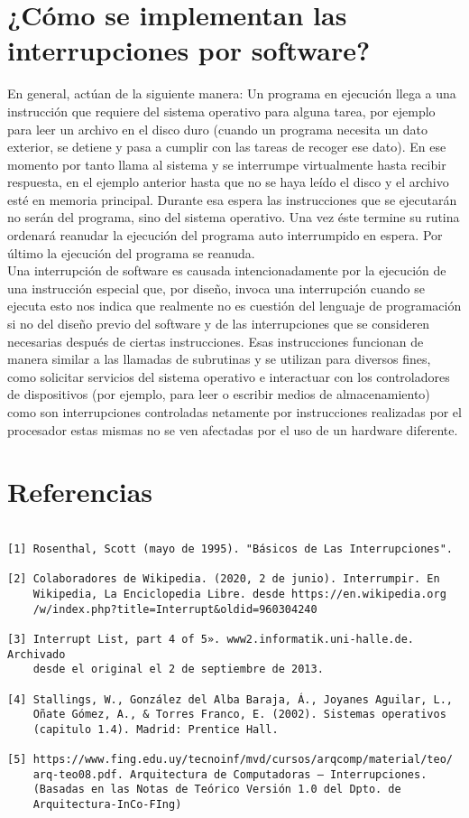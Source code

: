 \documentclass{article}
\begin{document}
\section*{¿Cómo se implementan las interrupciones por software?}

En general, actúan de la siguiente manera: Un programa en ejecución llega a una instrucción que requiere del sistema operativo para alguna tarea, por ejemplo para leer un archivo en el disco duro (cuando un programa necesita un dato exterior, se detiene y pasa a cumplir con las tareas de recoger ese dato). En ese momento por tanto llama al sistema y se interrumpe virtualmente hasta recibir respuesta, en el ejemplo anterior hasta que no se haya leído el disco y el archivo esté en memoria principal. Durante esa espera las instrucciones que se ejecutarán no serán del programa, sino del sistema operativo. Una vez éste termine su rutina ordenará reanudar la ejecución del programa auto interrumpido en espera. Por último la ejecución del programa se reanuda.\\

Una interrupción de software es causada intencionadamente por la ejecución de una instrucción especial que, por diseño, invoca una interrupción cuando se ejecuta esto nos indica que realmente no es cuestión del lenguaje de programación si no del diseño previo del software y de las interrupciones que se consideren necesarias después de ciertas instrucciones. Esas instrucciones funcionan de manera similar a las llamadas de subrutinas y se utilizan para diversos fines, como solicitar servicios del sistema operativo e interactuar con los controladores de dispositivos (por ejemplo, para leer o escribir medios de almacenamiento) como son interrupciones controladas netamente por instrucciones realizadas por el procesador estas mismas no se ven afectadas por el uso de un hardware diferente.




\section*{Referencias}

\small 

\begin{verbatim}
 
[1] Rosenthal, Scott (mayo de 1995). "Básicos de Las Interrupciones".        
    
[2] Colaboradores de Wikipedia. (2020, 2 de junio). Interrumpir. En   
    Wikipedia, La Enciclopedia Libre. desde https://en.wikipedia.org
    /w/index.php?title=Interrupt&oldid=960304240
    
[3] Interrupt List, part 4 of 5». www2.informatik.uni-halle.de. Archivado
    desde el original el 2 de septiembre de 2013.
    
[4] Stallings, W., González del Alba Baraja, Á., Joyanes Aguilar, L., 
    Oñate Gómez, A., & Torres Franco, E. (2002). Sistemas operativos 
    (capitulo 1.4). Madrid: Prentice Hall.
    
[5] https://www.fing.edu.uy/tecnoinf/mvd/cursos/arqcomp/material/teo/
    arq-teo08.pdf. Arquitectura de Computadoras – Interrupciones. 
    (Basadas en las Notas de Teórico Versión 1.0 del Dpto. de 
    Arquitectura-InCo-FIng)
\end{verbatim}
\end{document}
